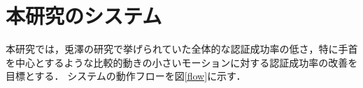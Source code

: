 \documentclass[11pt]{jarticle}
\begin{document}

\section{本研究のシステム}
本研究では，兎澤の研究\cite{tozawa}で挙げられていた全体的な認証成功率の低さ，特に手首を中心とするような比較的動きの小さいモーションに対する認証成功率の改善を目標とする．
システムの動作フローを図\ref{flow}に示す．
\end{document}
